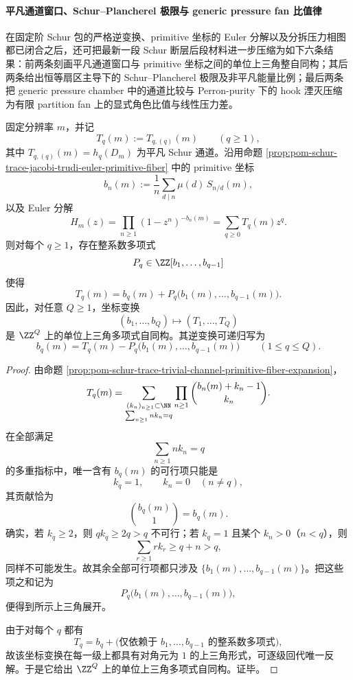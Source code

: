 \paragraph{平凡通道窗口、Schur--Plancherel 极限与 generic pressure fan 比值律}
在固定阶 Schur 包的严格逆变换、primitive 坐标的 Euler 分解以及分拆压力相图都已闭合之后，还可把最新一段 Schur 断层后段材料进一步压缩为如下六条结果：前两条刻画平凡通道窗口与 primitive 坐标之间的单位上三角整自同构；其后两条给出恒等扇区主导下的 Schur--Plancherel 极限及非平凡能量比例；最后两条把 generic pressure chamber 中的通道比较与 Perron-purity 下的 hook 湮灭压缩为有限 partition fan 上的显式角色比值与线性压力差。

\begin{theorem}\label{thm:xi-time-part63c-trivial-channel-unitriangular-primitive-automorphism}
固定分辨率 \(m\)，并记
\[
T_q(m):=T_{q,(q)}(m)
\qquad(q\ge 1),
\]
其中 \(T_{q,(q)}(m)=h_q(D_m)\) 为平凡 Schur 通道。沿用命题
\ref{prop:pom-schur-trace-jacobi-trudi-euler-primitive-fiber}
中的 primitive 坐标
\[
b_n(m):=\frac{1}{n}\sum_{d\mid n}\mu(d)\,S_{n/d}(m),
\]
以及 Euler 分解
\[
H_m(z)=\prod_{n\ge 1}(1-z^n)^{-b_n(m)}=\sum_{q\ge 0}T_q(m)z^q.
\]
则对每个 \(q\ge 1\)，存在整系数多项式
\[
P_q\in \ZZ[b_1,\dots,b_{q-1}]
\]
使得
\[
\boxed{\;
T_q(m)=b_q(m)+P_q\bigl(b_1(m),\dots,b_{q-1}(m)\bigr).\;}
\]
因此，对任意 \(Q\ge 1\)，坐标变换
\[
(b_1,\dots,b_Q)\longmapsto (T_1,\dots,T_Q)
\]
是 \(\ZZ^Q\) 上的单位上三角多项式自同构。其逆变换可递归写为
\[
\boxed{\;
b_q(m)=T_q(m)-P_q\bigl(b_1(m),\dots,b_{q-1}(m)\bigr)
\qquad(1\le q\le Q).\;}
\]
\end{theorem}
\begin{proof}
由命题 \ref{prop:pom-schur-trace-trivial-channel-primitive-fiber-expansion}，
\[
T_q(m)=
\sum_{\substack{(k_n)_{n\ge 1}\subset\NN\\ \sum_{n\ge 1}n k_n=q}}
\prod_{n\ge 1}\binom{b_n(m)+k_n-1}{k_n}.
\]
在全部满足
\[
\sum_{n\ge 1}n k_n=q
\]
的多重指标中，唯一含有 \(b_q(m)\) 的可行项只能是
\[
k_q=1,
\qquad
k_n=0\quad(n\neq q),
\]
其贡献恰为
\[
\binom{b_q(m)}{1}=b_q(m).
\]
确实，若 \(k_q\ge 2\)，则 \(qk_q\ge 2q>q\) 不可行；若 \(k_q=1\) 且某个 \(k_n>0\)（\(n<q\)），则
\[
\sum_{r\ge 1}r k_r\ge q+n>q,
\]
同样不可能发生。故其余全部可行项都只涉及 \(\{b_1(m),\dots,b_{q-1}(m)\}\)。把这些项之和记为
\[
P_q\bigl(b_1(m),\dots,b_{q-1}(m)\bigr),
\]
便得到所示上三角展开。

由于对每个 \(q\) 都有
\[
T_q=b_q+\text{(仅依赖于 }b_1,\dots,b_{q-1}\text{ 的整系数多项式)},
\]
故该坐标变换在每一级上都具有对角元为 \(1\) 的上三角形式，可逐级回代唯一反解。于是它给出 \(\ZZ^Q\) 上的单位上三角多项式自同构。证毕。
\end{proof}

